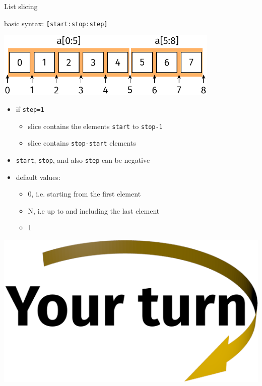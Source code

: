 \documentclass[svgnames]{beamer}
\begin{document}
\begin{frame}{List slicing}

 basic syntax: \texttt{[start:stop:step]}

 \vspace{0.2truecm}
 \begin{center}
  \includegraphics[width=0.8\textwidth]{listindexing1}
 \end{center}
 \begin{itemize}
  \item if \texttt{step=1}
  \begin{itemize}
      \item slice contains the elements \texttt{start} to \texttt{stop-1}
      \item slice contains \texttt{stop-start} elements
  \end{itemize}
  \item \texttt{start}, \texttt{stop}, and also \texttt{step} can be negative
  \item default values:
  \begin{itemize}
      \item {} 0, i.e. starting from the first element
      \item {} N, i.e up to and including the last element
      \item {} 1
  \end{itemize}
 \end{itemize}
\end{frame}

\begin{frame}
 \begin{center}

  \vspace{0.5truecm}
  \includegraphics[width=3truecm]{yourturn}
 \end{center}
\end{frame}
\end{document}
